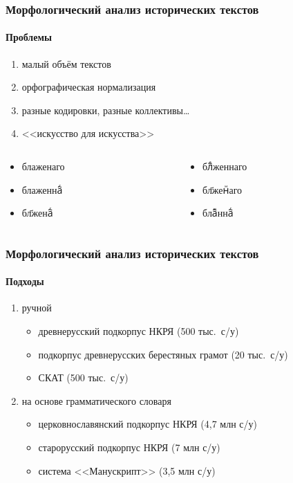 \documentclass[xetex, aspectratio=169, russian]{beamer}
\begin{document}
\begin{frame}
  \frametitle{Морфологический анализ исторических текстов}
  \framesubtitle{Проблемы}

  \begin{enumerate}
    \item малый объём текстов
    \item<2-> орфографическая нормализация
    \item<3-> разные кодировки, разные коллективы\ldots
    \item<4-> <<искусство для искусства>>
  \end{enumerate}

  \begin{columns}[c]
    \begin{column}{5cm}
      \begin{itemize}
        \item {\agio блаженаго}
        \item {\agio блаженна҇ⷢ}
        \item {\agio бл҃жена҇ⷢ}
      \end{itemize}
    \end{column}

    \begin{column}{5cm}
      \begin{itemize}
        \item {\agio бл҇ⷶженнаго}
        \item {\agio бл҃женⷩаго}
        \item {\agio бла҇ⷤнна҇ⷢ}
      \end{itemize}
    \end{column}
  \end{columns}
\end{frame}

\begin{frame}
  \frametitle{Морфологический анализ исторических текстов}
  \framesubtitle{Подходы}

  \begin{block}{}
    \begin{enumerate}
      \item<1-> ручной
      \begin{itemize}
        \item древнерусский подкорпус НКРЯ (500 тыс.\ с/у)
        \item подкорпус древнерусских берестяных грамот (20 тыс.\ с/у)
        \item \alert<3->{СКАТ} (500 тыс.\ с/у)
      \end{itemize}
      \item<2-> на основе грамматического словаря
      \begin{itemize}
        \item церковнославянский подкорпус НКРЯ (4,7 млн с/у)
        \item старорусский подкорпус НКРЯ (7 млн с/у)
        \item система <<Манускрипт>> (3,5 млн с/у)
      \end{itemize}
    \end{enumerate}
  \end{block}
\end{frame}
\end{document}
